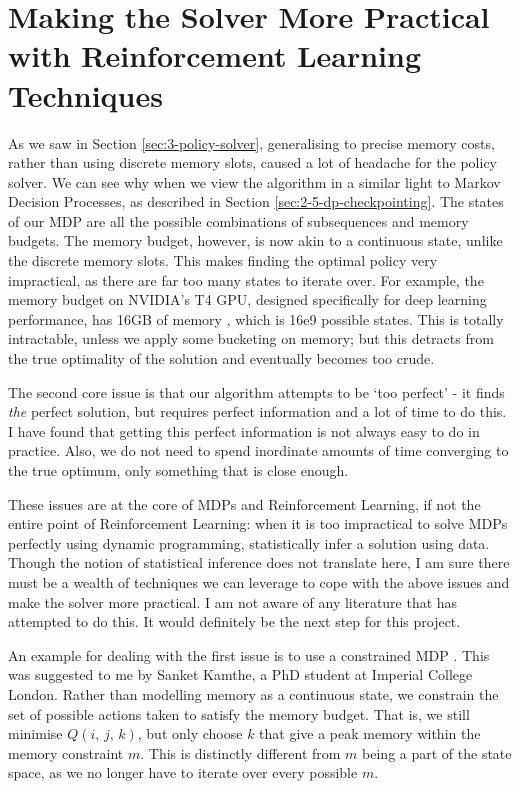 \section{Making the Solver More Practical with Reinforcement Learning Techniques}

As we saw in Section \ref{sec:3-policy-solver}, generalising to precise memory costs, rather than using discrete memory slots, caused a lot of headache for the policy solver.
We can see why when we view the algorithm in a similar light to Markov Decision Processes, as described in Section \ref{sec:2-5-dp-checkpointing}.
The states of our MDP are all the possible combinations of subsequences and memory budgets.
The memory budget, however, is now akin to a continuous state, unlike the discrete memory slots.
This makes finding the optimal policy very impractical, as there are far too many states to iterate over.
For example, the memory budget on NVIDIA's T4 GPU, designed specifically for deep learning performance, has 16GB of memory \cite{Nvidia2019-T4}, which is 16e9 possible states.
This is totally intractable, unless we apply some bucketing on memory; but this detracts from the true optimality of the solution and eventually becomes too crude.

The second core issue is that our algorithm attempts to be `too perfect' - it finds \textit{the} perfect solution, but requires perfect information and a lot of time to do this.
I have found that getting this perfect information is not always easy to do in practice.
Also, we do not need to spend inordinate amounts of time converging to the true optimum, only something that is close enough.

These issues are at the core of MDPs and Reinforcement Learning, if not the entire point of Reinforcement Learning: when it is too impractical to solve MDPs perfectly using dynamic programming, statistically infer a solution using data.
Though the notion of statistical inference does not translate here, I am sure there must be a wealth of techniques we can leverage to cope with the above issues and make the solver more practical.
I am not aware of any literature that has attempted to do this.
It would definitely be the next step for this project.

An example for dealing with the first issue is to use a constrained MDP \cite{Altman1999-constrained-mdps}.
This was suggested to me by Sanket Kamthe, a PhD student at Imperial College London.
Rather than modelling memory as a continuous state, we constrain the set of possible actions taken to satisfy the memory budget.
That is, we still minimise \(Q(i,\,j,\,k)\), but only choose \(k\) that give a peak memory within the memory constraint \(m\).
This is distinctly different from \(m\) being a part of the state space, as we no longer have to iterate over every possible \(m\).
